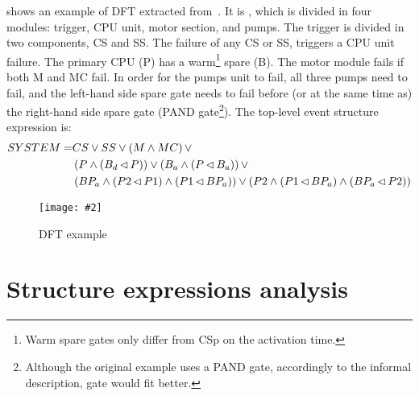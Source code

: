 \documentclass[12pt,openright,twoside,a4paper,oldfontcommands,english,brazil,final]{abntex2}
\theoremstyle{theo}
\newcommand{\includegraphicsaspectratio}[2][1]{%
  \texttt{[image: \#2]}%
}
\newcommand{\parsin}[1]{\ensuremath\left( #1 \right)}
\def\nibefore{\ensuremath\operatorname{\lhd}}
\begin{document}

\begin{sloppypar}
 shows an example of \ac{DFT} extracted from~\cite{MRL2014}.
It is , which is divided in four modules: trigger, CPU unit, motor section, and pumps.
The trigger is divided in two components, CS and SS.
The failure of any CS or SS, triggers a CPU unit failure.
The primary CPU (P) has a warm\footnote{Warm spare gates only differ from \ac{CSp} on the activation time.} spare (B).
The motor module fails if both M and MC fail.
In order for the pumps unit to fail, all three pumps need to fail, and the left-hand side spare gate needs to fail before (or at the same time as) the right-hand side spare gate (\ac{PAND} gate\footnote{Although the original example uses a \ac{PAND} gate, accordingly to the informal description,  gate would fit better.}).
The top-level event structure expression is:
\begin{align}
SYSTEM =& CS \lor SS \lor \parsin{M \land MC} \lor \\
  &\parsin{P \land \parsin{B_d \nibefore P}} \lor \parsin{B_a \land \parsin{P \nibefore B_a}} \lor \nonumber\\
  &\parsin{BP_a \land \parsin{P2 \nibefore P1} \land \parsin{P1 \nibefore BP_a}} \lor
  \parsin{P2 \land \parsin{P1 \nibefore BP_a} \land \parsin{BP_a \nibefore P2}}\nonumber
\end{align}
\end{sloppypar}

\begin{figure}[htb]
  \centering
  \includegraphicsaspectratio[0.65]{dft-example-mrl2014}
  \caption{\acs*{DFT} example}
  \label{fig:dft-example}
\end{figure}

\section{Structure expressions analysis}
\label{sec:structure-expressions-analysis}
\end{document}
